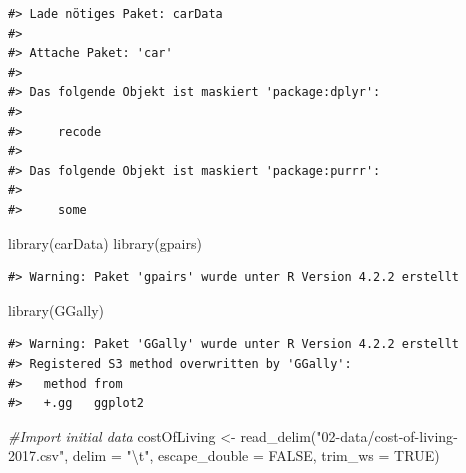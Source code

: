 \documentclass[
  11pt,
  a4paper,
  twoside]{scrbook}
\newenvironment{Shaded}{\begin{snugshade}}{\end{snugshade}}
\newcommand{\AttributeTok}[1]{\textcolor[rgb]{0.77,0.63,0.00}{#1}}
\newcommand{\CommentTok}[1]{\textcolor[rgb]{0.56,0.35,0.01}{\textit{#1}}}
\newcommand{\ConstantTok}[1]{\textcolor[rgb]{0.00,0.00,0.00}{#1}}
\newcommand{\FunctionTok}[1]{\textcolor[rgb]{0.00,0.00,0.00}{#1}}
\newcommand{\NormalTok}[1]{#1}
\newcommand{\OtherTok}[1]{\textcolor[rgb]{0.56,0.35,0.01}{#1}}
\newcommand{\SpecialCharTok}[1]{\textcolor[rgb]{0.00,0.00,0.00}{#1}}
\newcommand{\StringTok}[1]{\textcolor[rgb]{0.31,0.60,0.02}{#1}}
\begin{document}
\linespread{1}

\begin{verbatim}
#> Lade nötiges Paket: carData
#> 
#> Attache Paket: 'car'
#> 
#> Das folgende Objekt ist maskiert 'package:dplyr':
#> 
#>     recode
#> 
#> Das folgende Objekt ist maskiert 'package:purrr':
#> 
#>     some
\end{verbatim}

\linespread{1}

\begin{Shaded}
\begin{Highlighting}[]
\FunctionTok{library}\NormalTok{(carData)}
\FunctionTok{library}\NormalTok{(gpairs)}
\end{Highlighting}
\end{Shaded}

\linespread{1}

\begin{verbatim}
#> Warning: Paket 'gpairs' wurde unter R Version 4.2.2 erstellt
\end{verbatim}

\linespread{1}

\begin{Shaded}
\begin{Highlighting}[]
\FunctionTok{library}\NormalTok{(GGally)}
\end{Highlighting}
\end{Shaded}

\linespread{1}

\begin{verbatim}
#> Warning: Paket 'GGally' wurde unter R Version 4.2.2 erstellt
#> Registered S3 method overwritten by 'GGally':
#>   method from   
#>   +.gg   ggplot2
\end{verbatim}

\linespread{1}

\begin{Shaded}
\begin{Highlighting}[]

\CommentTok{\#Import initial data}
\NormalTok{costOfLiving }\OtherTok{\textless{}{-}} \FunctionTok{read\_delim}\NormalTok{(}\StringTok{"02{-}data/cost{-}of{-}living{-}2017.csv"}\NormalTok{, }
                      \AttributeTok{delim =} \StringTok{"}\SpecialCharTok{\textbackslash{}t}\StringTok{"}\NormalTok{, }\AttributeTok{escape\_double =} \ConstantTok{FALSE}\NormalTok{, }
                      \AttributeTok{trim\_ws =} \ConstantTok{TRUE}\NormalTok{)}
\end{Highlighting}
\end{Shaded}
\end{document}
